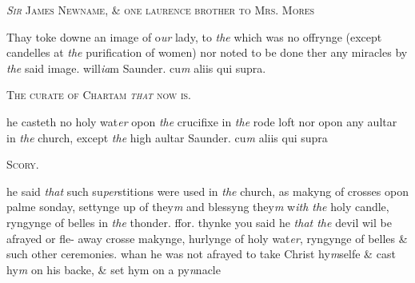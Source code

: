 \documentclass[12pt, a4paper]{book}
\begin{document}
            
               
				\begin{center} \begin{large} {\scshape 
                  \textit{Sir} James Newname, \& one laurence
 brother to Mrs. Mores} \end{large} \end{center}
			

            	
				\marginpar[\vspace{0.5cm}{\textcolor{Gray}{Images}}]{}
			
		\ifthenelse{\isodd{\thepage}}
		{\reversemarginpar}
		{\normalmarginpar}
		Thay toke downe an image of o\textit{ur} lady, to \textit{the} which
 was no offrynge (except candelles at \textit{the} purification of
 women) nor noted to be done ther any miracles by \textit{the}
 said image. will\textit{ia}m Saunder. cu\textit{m} aliis qui supra.
 

            
               
				\begin{center} \begin{large} {\scshape The curate of Chartam \textit{that} now is.} \end{large} \end{center}
			

            	
				\marginpar[\vspace{0.5cm}{\textcolor{Gray}{holy water}}]{}
			
		\ifthenelse{\isodd{\thepage}}
		{\reversemarginpar}
		{\normalmarginpar}
		he casteth no holy wat\textit{er} opon \textit{the} crucifixe in \textit{the} rode loft
 nor opon any aultar in \textit{the} church, except \textit{the} high aultar
            		Saunder. cu\textit{m} aliis qui supra
 

            
            	
				\begin{center} \begin{large} {\scshape Scory.} \end{large} \end{center}
			


	
				\marginpar[\vspace{0.5cm}{\textcolor{Gray}{ceremonies}}]{}
			
	
		\ifthenelse{\isodd{\thepage}}
		{\reversemarginpar}
		{\normalmarginpar}
		he said \textit{that} such su\textit{per}stitions were used in \textit{the} church, as makyng
 of crosses opon palme sonday, settynge up of they\textit{m} and blessyng
 they\textit{m} w\textit{ith the} holy candle, ryngynge of belles in \textit{the} thonder.
 ffor. thynke you said he \textit{that the} devil wil be afrayed or fle-
 away crosse makynge, hurlynge of holy wat\textit{er}, ryngynge
 of belles \& such other ceremonies. whan he was not
 afrayed to take Christ hy\textit{m}selfe \& cast hy\textit{m} on his backe,
 \& set hym on a py\textit{n}nacle
	
\end{document}
